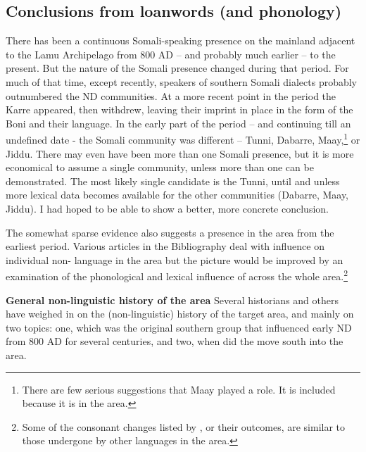 \documentclass[output=paper
,newtxmath
,modfonts
,nonflat]{langsci/langscibook}
\begin{document}
\subsection{Conclusions from loanwords (and phonology)}\label{sec:nurse:5.5} There has been a continuous Somali-speaking presence on the mainland adjacent to the Lamu Archipelago from 800 AD – and probably much earlier – to the present. But the nature of the Somali presence changed during that period. For much of that time, except recently, speakers of southern Somali dialects probably outnumbered the ND communities. At a more recent point in the period the Karre appeared, then withdrew, leaving their imprint in place in the form of the Boni and their language. In the early part of the period – and continuing till an undefined date - the Somali community was different – Tunni, Dabarre, Maay,\footnote{There are few serious suggestions that Maay played a role. It is included because it is in the area.}  or Jiddu. There may even have been more than one Somali presence, but it is more economical to assume a single community, unless more than one can be demonstrated. The most likely single candidate is the Tunni, until and unless more lexical data becomes available for the other communities (Dabarre, Maay, Jiddu). I had hoped to be able to show a better, more concrete conclusion.

The somewhat sparse evidence also suggests a  presence in the area from the earliest period. Various articles in the Bibliography deal with  influence on individual non- language in the area but the picture would be improved by an examination of the phonological and lexical influence of  across the whole area.\footnote{Some of the consonant changes listed by \citet[115-26]{Ehret1980}, or their outcomes, are similar to those undergone by other languages in the area.}  

\textbf{General non-linguistic history of the area} Several historians and others have weighed in on the (non-linguistic) history of the target area, and mainly on two topics: one, which was the original southern  group that influenced early ND from 800 AD for several centuries, and two, when did the  move south into the area.
\end{document}
